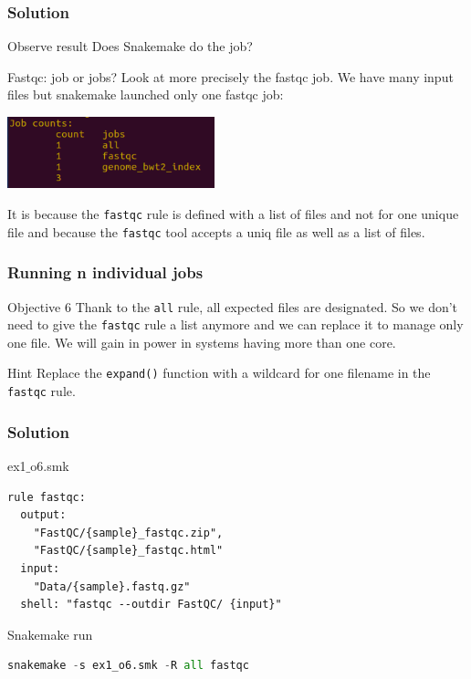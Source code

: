 \begin{frame}[containsverbatim]
\frametitle{Solution}
\begin{exampleblock}{Observe result}
Does Snakemake do the job?\\
\end{exampleblock}
\begin{exampleblock}{Fastqc: job or jobs?}
Look at more precisely the fastqc job. We have many input files but snakemake launched only one fastqc job:
\begin{center}
    \includegraphics[width=6cm]{03_workflow/images/FAIR_ex1_o5_smk.png}
\end{center}
It is because the \verb|fastqc| rule is defined with a list of files and not for one unique file and because the \verb|fastqc| tool accepts a uniq file as well as a list of files.
\end{exampleblock}
\end{frame}
\begin{frame}[containsverbatim]
\frametitle{Running n individual jobs}
\begin{exampleblock}{Objective 6}
Thank to the \verb|all| rule, all expected files are designated. So we don't need to give the \verb|fastqc| rule a list anymore and we can replace it to manage only one file. We will gain in power in systems having more than one core.
\end{exampleblock}
\begin{exampleblock}{Hint}
Replace the \verb|expand()| function with a wildcard for one filename in the \verb|fastqc| rule.
\end{exampleblock}
\end{frame}
\begin{frame}[containsverbatim]
\frametitle{Solution}
\begin{exampleblock}{ex1$\_$o6.smk}
\begin{lstlisting}
rule fastqc:
  output:
    "FastQC/{sample}_fastqc.zip",
    "FastQC/{sample}_fastqc.html"
  input:
    "Data/{sample}.fastq.gz"
  shell: "fastqc --outdir FastQC/ {input}"
\end{lstlisting}
\end{exampleblock}
\begin{exampleblock}{Snakemake run}
\begin{lstlisting}[language=python]
snakemake -s ex1_o6.smk -R all fastqc
\end{lstlisting}
\end{exampleblock}
\end{frame}

